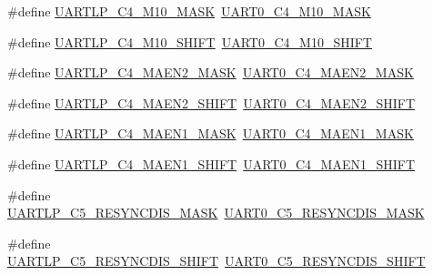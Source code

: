 \begin{DoxyCompactItemize}
\item 
\#define \hyperlink{group___backward___compatibility___symbols_gae6f095de7ec64e7c5f070cace84825f2}{U\+A\+R\+T\+L\+P\+\_\+\+C4\+\_\+\+M10\+\_\+\+M\+A\+SK}~\hyperlink{group___u_a_r_t0___register___masks_ga778c67fb72d292b38f63c9381650b13f}{U\+A\+R\+T0\+\_\+\+C4\+\_\+\+M10\+\_\+\+M\+A\+SK}
\item 
\#define \hyperlink{group___backward___compatibility___symbols_ga5bf55e06cfac817fc0cc879b5bd8df17}{U\+A\+R\+T\+L\+P\+\_\+\+C4\+\_\+\+M10\+\_\+\+S\+H\+I\+FT}~\hyperlink{group___u_a_r_t0___register___masks_gab29f680fddde40016111f2aef73cc7b2}{U\+A\+R\+T0\+\_\+\+C4\+\_\+\+M10\+\_\+\+S\+H\+I\+FT}
\item 
\#define \hyperlink{group___backward___compatibility___symbols_ga90e33c5bb1be6d39e1d0f937253daf0b}{U\+A\+R\+T\+L\+P\+\_\+\+C4\+\_\+\+M\+A\+E\+N2\+\_\+\+M\+A\+SK}~\hyperlink{group___u_a_r_t0___register___masks_ga969c6c22e07f6502ff99cbf303b87d23}{U\+A\+R\+T0\+\_\+\+C4\+\_\+\+M\+A\+E\+N2\+\_\+\+M\+A\+SK}
\item 
\#define \hyperlink{group___backward___compatibility___symbols_ga9b129e14e5aac5ef9707937d91fd0046}{U\+A\+R\+T\+L\+P\+\_\+\+C4\+\_\+\+M\+A\+E\+N2\+\_\+\+S\+H\+I\+FT}~\hyperlink{group___u_a_r_t0___register___masks_gaeebc760f3af31b66126f430423fc0131}{U\+A\+R\+T0\+\_\+\+C4\+\_\+\+M\+A\+E\+N2\+\_\+\+S\+H\+I\+FT}
\item 
\#define \hyperlink{group___backward___compatibility___symbols_gaf8e8a31f6af1dbfe4e930d0c7bffe375}{U\+A\+R\+T\+L\+P\+\_\+\+C4\+\_\+\+M\+A\+E\+N1\+\_\+\+M\+A\+SK}~\hyperlink{group___u_a_r_t0___register___masks_ga68a92c3e845ce6ef575114d47d5d447c}{U\+A\+R\+T0\+\_\+\+C4\+\_\+\+M\+A\+E\+N1\+\_\+\+M\+A\+SK}
\item 
\#define \hyperlink{group___backward___compatibility___symbols_ga0c83ed1dac8e50a43d52747f42b80a3d}{U\+A\+R\+T\+L\+P\+\_\+\+C4\+\_\+\+M\+A\+E\+N1\+\_\+\+S\+H\+I\+FT}~\hyperlink{group___u_a_r_t0___register___masks_ga799c5f7dd350d4bd89d04167fa771396}{U\+A\+R\+T0\+\_\+\+C4\+\_\+\+M\+A\+E\+N1\+\_\+\+S\+H\+I\+FT}
\item 
\#define \hyperlink{group___backward___compatibility___symbols_ga6c8f73a689a6c4d5d7425325b8c3bde2}{U\+A\+R\+T\+L\+P\+\_\+\+C5\+\_\+\+R\+E\+S\+Y\+N\+C\+D\+I\+S\+\_\+\+M\+A\+SK}~\hyperlink{group___u_a_r_t0___register___masks_ga6cbc7334e715b4d22547ae185dc63dda}{U\+A\+R\+T0\+\_\+\+C5\+\_\+\+R\+E\+S\+Y\+N\+C\+D\+I\+S\+\_\+\+M\+A\+SK}
\item 
\#define \hyperlink{group___backward___compatibility___symbols_gaff26147c2d7f8a45ddaa3d4ecb42343d}{U\+A\+R\+T\+L\+P\+\_\+\+C5\+\_\+\+R\+E\+S\+Y\+N\+C\+D\+I\+S\+\_\+\+S\+H\+I\+FT}~\hyperlink{group___u_a_r_t0___register___masks_gaf769ed12082fb9c441d47f5cdf1117e0}{U\+A\+R\+T0\+\_\+\+C5\+\_\+\+R\+E\+S\+Y\+N\+C\+D\+I\+S\+\_\+\+S\+H\+I\+FT}

\end{DoxyCompactItemize}
